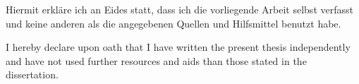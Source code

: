     \par\noindent Hiermit erkläre ich an Eides statt, dass ich die vorliegende Arbeit selbst verfasst und keine anderen als die angegebenen Quellen und Hilfsmittel benutzt habe.
    \vspace*{2em}%
    \par\noindent I hereby declare upon oath that I have written the present thesis independently and have not used further resources and aids than those stated in the dissertation.

